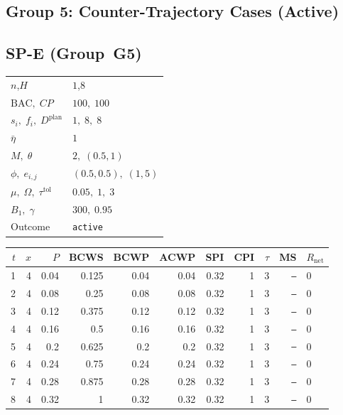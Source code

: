 \documentclass[12pt, a4paper]{article}
\newcommand{\BAC}{\mathrm{BAC}}
\begin{document}
\newpage


\subsection*{Group 5: Counter-Trajectory Cases (Active)}

\subsection*{SP-E  (Group~G5)}
\begin{center}
\begin{tabular}{ll}
\toprule
$n$,\;$H$ & $1$,\;$8$ \\
$\BAC,\;CP$ & $100,\;100$ \\
$s_i,\;f_i,\;D^{\mathrm{plan}}$ & $1,\;8,\;8$ \\
$\bar\eta$ & $1$ \\
$M,\;\theta$ & $2,\;(0.5,1)$ \\
$\phi,\;e_{i,j}$ & $(0.5,0.5),\;(1,5)$ \\
$\mu,\;\Omega,\;\tau^{\mathrm{tol}}$ & $0.05,\;1,\;3$ \\
$B_1,\;\gamma$ & $300,\;0.95$ \\
Outcome & \texttt{active} \\
\bottomrule
\end{tabular}
\end{center}

\begin{center}
\begin{tabular}{rrrrrrrrrrl}
\toprule
$t$ & $x$ & $P$ & BCWS & BCWP & ACWP & SPI & CPI & $\tau$ & MS & $R_{\mathrm{net}}$\\
\midrule
1 & 4 & 0.04 & 0.125 & 0.04 & 0.04 & 0.32 & 1 & 3 & \texttt{---} & 0 \\
2 & 4 & 0.08 & 0.25 & 0.08 & 0.08 & 0.32 & 1 & 3 & \texttt{---} & 0 \\
3 & 4 & 0.12 & 0.375 & 0.12 & 0.12 & 0.32 & 1 & 3 & \texttt{---} & 0 \\
4 & 4 & 0.16 & 0.5 & 0.16 & 0.16 & 0.32 & 1 & 3 & \texttt{---} & 0 \\
5 & 4 & 0.2 & 0.625 & 0.2 & 0.2 & 0.32 & 1 & 3 & \texttt{---} & 0 \\
6 & 4 & 0.24 & 0.75 & 0.24 & 0.24 & 0.32 & 1 & 3 & \texttt{---} & 0 \\
7 & 4 & 0.28 & 0.875 & 0.28 & 0.28 & 0.32 & 1 & 3 & \texttt{---} & 0 \\
8 & 4 & 0.32 & 1 & 0.32 & 0.32 & 0.32 & 1 & 3 & \texttt{---} & 0 \\
\bottomrule
\end{tabular}
\end{center}
\end{document}
